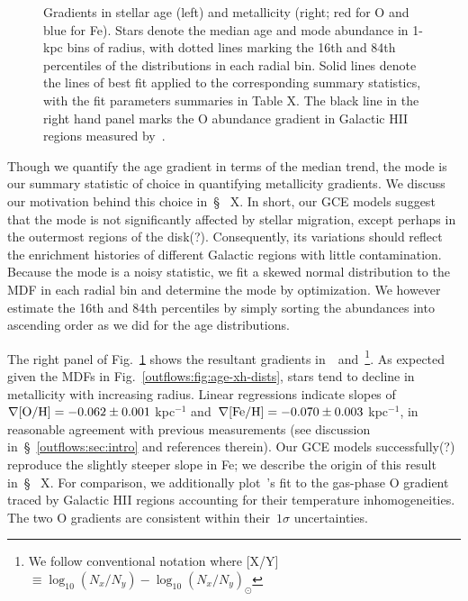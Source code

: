\begin{figure}
\caption{
Gradients in stellar age (left) and metallicity (right; red for O and blue for
Fe).
Stars denote the median age and mode abundance in 1-kpc bins of radius, with
dotted lines marking the 16th and 84th percentiles of the distributions in each
radial bin.
Solid lines denote the lines of best fit applied to the corresponding summary
statistics, with the fit parameters summaries in Table X.
The black line in the right hand panel marks the O abundance gradient in
Galactic HII regions measured by~\citet{MendezDelgado2022}.
}
\label{outflows:fig:gradxh-gradage}
\end{figure}

Though we quantify the age gradient in terms of the median trend, the mode is
our summary statistic of choice in quantifying metallicity gradients.
We discuss our motivation behind this choice in~\S~{\color{red} X}.
In short, our GCE models suggest that the mode is not significantly affected
by stellar migration, {\color{red} except perhaps in the outermost regions of
the disk(?).}
Consequently, its variations should reflect the enrichment histories of
different Galactic regions with little contamination.
Because the mode is a noisy statistic, we fit a skewed normal distribution to
the MDF in each radial bin and determine the mode by optimization.
We however estimate the 16th and 84th percentiles by simply sorting the
abundances into ascending order as we did for the age distributions.
\par
The right panel of Fig.~\ref{outflows:fig:gradxh-gradage} shows the resultant
gradients in~\oh~and~\feh\footnote{
	We follow conventional notation where
	[X/Y]~$\equiv \log_{10} (N_x / N_y) - \log_{10} (N_x / N_y)_\odot$
}.
As expected given the MDFs in Fig.~\ref{outflows:fig:age-xh-dists}, stars tend
to decline in metallicity with increasing radius.
Linear regressions indicate slopes of~$\nabla\text{[O/H]} = -0.062 \pm 0.001$ kpc$^{-1}$
and~$\nabla\text{[Fe/H]} = -0.070 \pm 0.003$ kpc$^{-1}$, in reasonable agreement with
previous measurements (see discussion in~\S~\ref{outflows:sec:intro} and
references therein).
Our GCE models {\color{red} successfully(?)} reproduce the slightly steeper
slope in Fe; we describe the origin of this result in~\S~{\color{red} X}.
For comparison, we additionally plot~\citeauthor{MendezDelgado2022}'s
\citeyearpar{MendezDelgado2022} fit to the gas-phase O gradient traced by
Galactic HII regions accounting for their temperature inhomogeneities.
The two O gradients are consistent within their~$1\sigma$ uncertainties.

